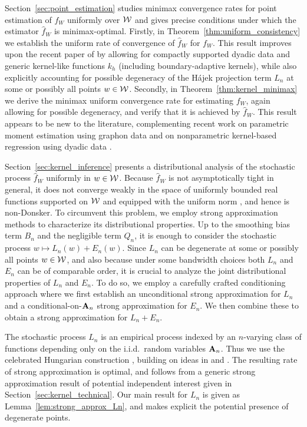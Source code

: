 Section~\ref{sec:point_estimation} studies minimax convergence rates for point
estimation of $f_W$ uniformly over $\mathcal{W}$ and gives precise conditions under
which the estimator $\hat{f}_W$ is minimax-optimal.
Firstly, in Theorem~\ref{thm:uniform_consistency} we establish the uniform rate
of convergence of $\hat{f}_W$ for $f_W$. This result improves upon the
recent paper of \citet{chiang2020empirical} by allowing
for compactly supported dyadic data and
generic kernel-like functions $k_h$ (including boundary-adaptive kernels), while
also explicitly accounting for possible degeneracy of the
H\'{a}jek projection term $L_n$ at some or possibly all points $w\in\mathcal{W}$.
Secondly, in Theorem~\ref{thm:kernel_minimax} we derive the
minimax uniform convergence rate for estimating
$f_W$, again allowing for possible degeneracy,
and verify that it is achieved by $\hat f_W$.
This result appears to be new to the literature,
complementing recent work on parametric moment estimation
using graphon data \citep{gao2021minimax} and on nonparametric
kernel-based regression using dyadic data \citep{graham2021dyadicregression}.

Section~\ref{sec:kernel_inference} presents a distributional analysis of
the stochastic process $\hat{f}_W$ uniformly in $w \in \mathcal{W}$. Because
$\hat{f}_W$ is not asymptotically tight in general, it
does not converge
weakly in the space of uniformly bounded real functions supported on $\mathcal{W}$ and
equipped with the uniform norm \citep{van1996weak},
and hence is non-Donsker.
To circumvent this problem,
we employ strong approximation methods to characterize
its distributional properties.
Up to the smoothing bias term $B_n$ and the negligible term $Q_n$,
it is enough to consider
the stochastic process $w \mapsto L_n(w)+E_n(w)$.
Since $L_n$ can be degenerate at some or possibly all points $w\in\mathcal{W}$, and also
because under some bandwidth choices both $L_n$ and $E_n$ can be of comparable
order, it is crucial to analyze the joint distributional properties of $L_n$ and
$E_n$. To do so, we employ a carefully crafted conditioning approach where we
first establish an unconditional strong approximation for $L_n$ and a
conditional-on-$\mathbf{A}_n$ strong approximation for $E_n$.
We then combine these to obtain a strong approximation for $L_n+E_n$.

The stochastic process $L_n$ is an empirical process indexed by an $n$-varying
class of functions depending only on the i.i.d.\ random variables $\mathbf{A}_n$. Thus
we use the celebrated Hungarian
construction \citep{komlos1975approximation}, building on ideas in
\citet{gine2004kernel} and \citet{gine2010confidence}. The resulting rate of
strong approximation is optimal, and follows from a generic strong approximation
result of potential independent interest given in
Section~\ref{sec:kernel_technical}.
Our main result for $L_n$ is given as Lemma~\ref{lem:strong_approx_Ln},
and makes explicit the potential presence of degenerate points.

